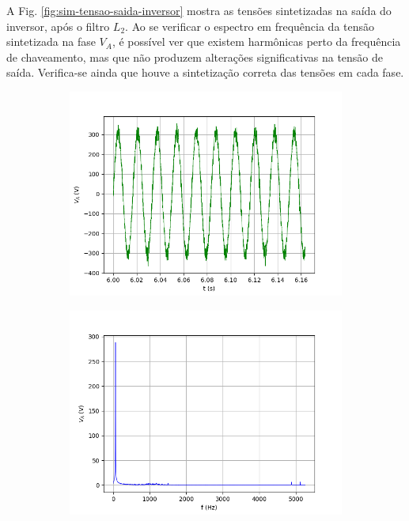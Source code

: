 A Fig. \ref{fig:sim-tensao-saida-inversor} mostra as tensões sintetizadas na saída do inversor, após o filtro $L_2$.
Ao se verificar o espectro em frequência da tensão sintetizada na fase $V_A$, é possível ver que existem harmônicas 
perto da frequência de chaveamento, mas que não produzem alterações significativas na tensão de saída. 
Verifica-se ainda que houve a sintetização correta das tensões em cada fase.

\begin{figure}[!hbt]
	\centering
	\begin{subfigure}[b]{0.49\textwidth}
	\centering
		\includegraphics[width=\textwidth]{figuras/sim_figures/inversor_e_boost/tensao_va.png}
		\caption{}
   \end{subfigure}
   \begin{subfigure}[b]{0.49\textwidth}
	\centering
		\includegraphics[width=\textwidth]{figuras/sim_figures/inversor_e_boost/tensao_va_espectro.png}

\end{subfigure}
\end{figure}
